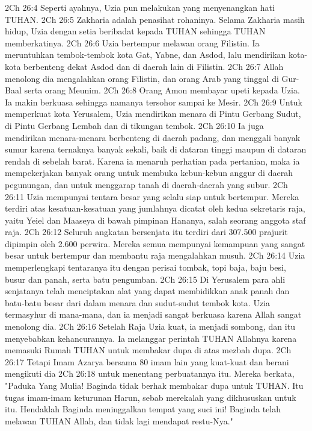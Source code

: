 2Ch 26:4  Seperti ayahnya, Uzia pun melakukan yang menyenangkan hati TUHAN.
2Ch 26:5  Zakharia adalah penasihat rohaninya. Selama Zakharia masih hidup, Uzia dengan setia beribadat kepada TUHAN sehingga TUHAN memberkatinya.
2Ch 26:6  Uzia bertempur melawan orang Filistin. Ia meruntuhkan tembok-tembok kota Gat, Yabne, dan Asdod, lalu mendirikan kota-kota berbenteng dekat Asdod dan di daerah lain di Filistin.
2Ch 26:7  Allah menolong dia mengalahkan orang Filistin, dan orang Arab yang tinggal di Gur-Baal serta orang Meunim.
2Ch 26:8  Orang Amon membayar upeti kepada Uzia. Ia makin berkuasa sehingga namanya tersohor sampai ke Mesir.
2Ch 26:9  Untuk memperkuat kota Yerusalem, Uzia mendirikan menara di Pintu Gerbang Sudut, di Pintu Gerbang Lembah dan di tikungan tembok.
2Ch 26:10  Ia juga mendirikan menara-menara berbenteng di daerah padang, dan menggali banyak sumur karena ternaknya banyak sekali, baik di dataran tinggi maupun di dataran rendah di sebelah barat. Karena ia menaruh perhatian pada pertanian, maka ia mempekerjakan banyak orang untuk membuka kebun-kebun anggur di daerah pegunungan, dan untuk menggarap tanah di daerah-daerah yang subur.
2Ch 26:11  Uzia mempunyai tentara besar yang selalu siap untuk bertempur. Mereka terdiri atas kesatuan-kesatuan yang jumlahnya dicatat oleh kedua sekretaris raja, yaitu Yeiel dan Maaseya di bawah pimpinan Hananya, salah seorang anggota staf raja.
2Ch 26:12  Seluruh angkatan bersenjata itu terdiri dari 307.500 prajurit dipimpin oleh 2.600 perwira. Mereka semua mempunyai kemampuan yang sangat besar untuk bertempur dan membantu raja mengalahkan musuh.
2Ch 26:14  Uzia memperlengkapi tentaranya itu dengan perisai tombak, topi baja, baju besi, busur dan panah, serta batu pengumban.
2Ch 26:15  Di Yerusalem para ahli senjatanya telah menciptakan alat yang dapat membidikkan anak panah dan batu-batu besar dari dalam menara dan sudut-sudut tembok kota. Uzia termasyhur di mana-mana, dan ia menjadi sangat berkuasa karena Allah sangat menolong dia.
2Ch 26:16  Setelah Raja Uzia kuat, ia menjadi sombong, dan itu menyebabkan kehancurannya. Ia melanggar perintah TUHAN Allahnya karena memasuki Rumah TUHAN untuk membakar dupa di atas mezbah dupa.
2Ch 26:17  Tetapi Imam Azarya bersama 80 imam lain yang kuat-kuat dan berani mengikuti dia
2Ch 26:18  untuk menentang perbuatannya itu. Mereka berkata, "Paduka Yang Mulia! Baginda tidak berhak membakar dupa untuk TUHAN. Itu tugas imam-imam keturunan Harun, sebab merekalah yang dikhususkan untuk itu. Hendaklah Baginda meninggalkan tempat yang suci ini! Baginda telah melawan TUHAN Allah, dan tidak lagi mendapat restu-Nya."
